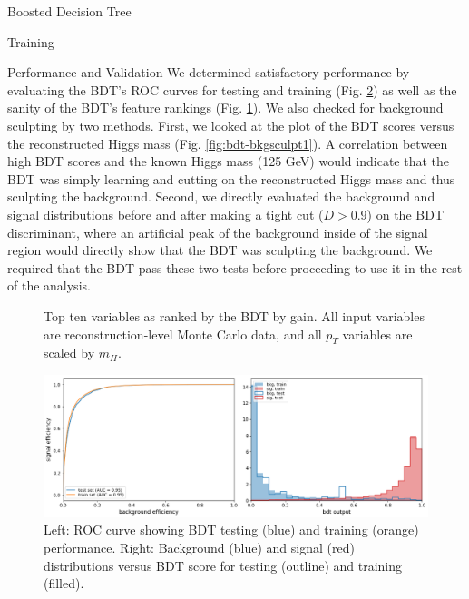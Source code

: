 \begin{section}{Boosted Decision Tree}
\begin{subsection}{Training}
\end{subsection}
\begin{subsection}{Performance and Validation}
We determined satisfactory performance by evaluating the BDT's ROC curves for testing and training (Fig. \ref{fig:bdt-performance}) as well as the sanity of the BDT's feature rankings (Fig. \ref{fig:bdt-vars}). We also checked for background sculpting by two methods. First, we looked at the plot of the BDT scores versus the reconstructed Higgs mass (Fig. \ref{fig:bdt-bkgsculpt1}). A correlation between high BDT scores and the known Higgs mass (125 GeV) would indicate that the BDT was simply learning and cutting on the reconstructed Higgs mass and thus sculpting the background. Second, we directly evaluated the background and signal distributions before and after making a tight cut ($D > 0.9$) on the BDT discriminant, where an artificial peak of the background inside of the signal region would directly show that the BDT was sculpting the background. We required that the BDT pass these two tests before proceeding to use it in the rest of the analysis.

\begin{figure}[htb]
\begin{center}

\end{center}
\caption{Top ten variables as ranked by the BDT by gain. All input variables are reconstruction-level Monte Carlo data, and all $p_{T}$ variables are scaled by $m_{H}.$}
\label{fig:bdt-vars}
\end{figure}

\begin{figure}[htb]
\begin{center}
\includegraphics[width=.95\linewidth]{Dissertation/fig/bdt-performance.png}
\end{center}
\caption{Left: ROC curve showing BDT testing (blue) and training (orange) performance. Right: Background (blue) and signal (red) distributions versus BDT score for testing (outline) and training (filled).}
\label{fig:bdt-performance}
\end{figure}


\end{subsection}
\end{section}
